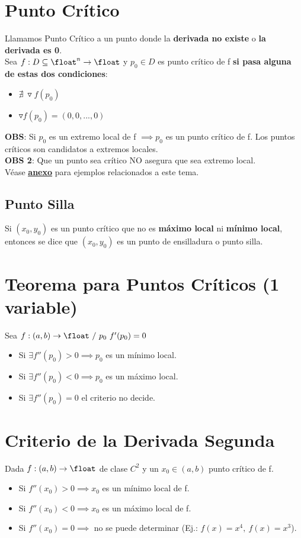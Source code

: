 \documentclass[10pt,a4paper]{article}
\begin{document}
\section*{Punto Crítico}
Llamamos Punto Crítico a un punto donde la \textbf{derivada no existe} o \textbf{la derivada es 0}. \\
Sea $f:D \subseteq \float^{n} \rightarrow \float$ y $p_{0} \in D$ es punto crítico de f \textbf{si pasa alguna de estas dos condiciones}: 
\begin{itemize}
    \item $\nexists \ \triangledown f(p_{0})$
    \item $\triangledown f(p_{0}) = (0, 0, ..., 0)$
\end{itemize}
\textbf{OBS}: Si $p_{0}$ es un extremo local de f $\implies p_{0}$ es un punto crítico de f. Los puntos críticos son candidatos a extremos locales. \\
\textbf{OBS 2}: Que un punto sea crítico NO asegura que sea extremo local. \\
Véase \hyperref[subsec:calculo_puntos_criticos]{\underline{\textbf{anexo}}} para ejemplos relacionados a este tema. 
\subsection*{Punto Silla}
Si $(x_{0}, y_{0})$ es un punto crítico que no es \textbf{máximo local} ni \textbf{mínimo local}, entonces se dice que $(x_{0}, y_{0})$ es un punto de ensilladura o punto silla.
\section*{Teorema para Puntos Críticos (1 variable)}
Sea $f:(a,b) \rightarrow \float \ / \ p_{0} \ f'(p_{0})=0$
\begin{itemize}
    \item Si $\exists f''(p_{0})>0 \implies p_{0}$ es un mínimo local.
    \item Si $\exists f''(p_{0})<0 \implies p_{0}$ es un máximo local.
    \item Si $\exists f''(p_{0}) = 0$ el criterio no decide. 
\end{itemize}
\section*{Criterio de la Derivada Segunda}
Dada $f:(a,b) \rightarrow \float$ de clase $C^{2}$ y un $x_{0} \in (a,b)$ punto crítico de f. 
\begin{itemize}
    \item Si $f''(x_{0}) > 0 \implies x_{0}$ es un mínimo local de f.
    \item Si $f''(x_{0}) < 0 \implies x_{0}$ es un máximo local de f.
    \item Si $f''(x_{0}) = 0 \implies $ no se puede determinar (Ej.: $f(x) = x^{4}, \ f(x) = x^{3}$).
\end{itemize}
\end{document}

